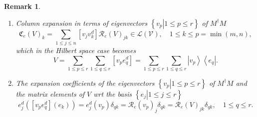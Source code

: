 \documentclass[aps,preprint]{revtex4}%
\newtheorem{remark}[theorem]{Remark}
\begin{document}
\begin{remark}
\begin{enumerate}
\item \emph{Column expansion} in terms of eigenvectors $\left\{  \left.
v_{p}\right\vert 1\leq p\leq r\right\}  $ of $M^{\dagger}M$%
\begin{equation}
\mathfrak{C}_{e}\left(  V\right)  _{k}=\sum_{1\leq j\leq n}\left[  v_{j}%
v_{k}^{d}\right]  \mathcal{R}_{e}\left(  V\right)  _{jk}\in\mathcal{L}\left(
\mathcal{V}\right)  ,\quad1\leq k\leq p=\min(m,n),
\end{equation}
which in the Hilbert space case becomes
\begin{equation}
V=\sum_{1\leq p\leq r}\sum_{1\leq q\leq r}\left[  v_{p}e_{q}^{d}\right]
=\sum_{1\leq p\leq r}\sum_{1\leq q\leq r}\left\vert v_{p}\right\rangle
\left\langle e_{q}\right\vert .
\end{equation}


\item The expansion coefficients of the eigenvectors $\left\{  \left.
v_{p}\right\vert 1\leq p\leq r\right\}  $ of $M^{\dagger}M$ and the matrix
elements of $V$ wrt the basis $\left\{  \left.  e_{j}\right\vert 1\leq j\leq
r\right\}  $
\begin{equation}
e_{j}^{d}\left(  \left[  v_{p}e_{q}^{d}\right]  \left(  e_{k}\right)  \right)
=e_{j}^{d}\left(  v_{p}\right)  \delta_{qk}=\mathcal{R}_{e}\left(
v_{p}\right)  _{j}\delta_{qk}=\mathcal{R}_{e}\left(  V\right)  _{jk}%
\delta_{qk},\quad1\leq q\leq r.
\end{equation}



\end{enumerate}
\end{remark}
\end{document}

